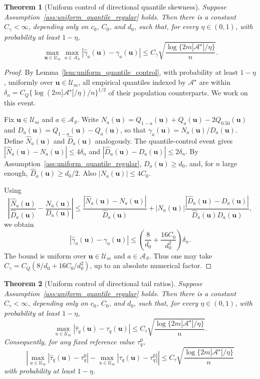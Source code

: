 \documentclass[11pt]{article}
\theoremstyle{plain}
\newtheorem{theorem}{Theorem}
\theoremstyle{definition}
\theoremstyle{remark}
\def\u{\bm{u}}
\newcommand{\abs}[1]{\left\lvert #1 \right\rvert}
\begin{document}
\begin{theorem}[Uniform control of directional quantile skewness]
	\label{thm:uniform_quantile_skewness_concentration}
	Suppose Assumption~\ref{ass:uniform_quantile_regular} holds. Then there is a constant \(C_\gamma<\infty\), depending only on \(c_0\), \(C_0\), and \(d_0\), such that, for every \(\eta\in(0,1)\), with probability at least \(1-\eta\),
	\[
	\max_{\u\in\mathcal U_m}\max_{a\in\mathcal A_S} \abs{\widehat\gamma_{a}(\u)-\gamma_{a}(\u)} \leqslant C_\gamma
	\sqrt{\frac{\log\{2m \abs{\mathcal A^\star}/\eta\}}{n}}.
	\]
\end{theorem}

\begin{proof}
	By Lemma~\ref{lem:uniform_quantile_control}, with probability at least \(1-\eta\), uniformly over \(\u\in\mathcal U_m\), all empirical quantiles indexed by \(\mathcal A^\star\) are within \(\delta_n=C_Q\{\log(2m|\mathcal A^\star|/\eta)/n\}^{1/2}\) of their population counterparts. We work on this event.

	Fix \(\u\in\mathcal U_m\) and \(a\in\mathcal A_S\). Write \(N_a(\u)=Q_{1-a}(\u)+Q_a(\u)-2Q_{0.50}(\u)\) and \(D_a(\u)=Q_{1-a}(\u)-Q_a(\u)\), so that \(\gamma_{a}(\u)=N_a(\u)/D_a(\u)\). Define \(\widehat N_a(\u)\) and \(\widehat D_a(\u)\) analogously. The quantile-control event gives \(|\widehat N_a(\u)-N_a(\u)|\leqslant 4\delta_n\) and \(|\widehat D_a(\u)-D_a(\u)|\leqslant 2\delta_n\). By Assumption~\ref{ass:uniform_quantile_regular}, \(D_a(\u)\geqslant d_0\), and, for \(n\) large enough, \(\widehat D_a(\u)\geqslant d_0/2\). Also \(|N_a(\u)|\leqslant 4C_0\).

	Using
	\[
	\left|
	\frac{\widehat N_a(\u)}{\widehat D_a(\u)}
	-
	\frac{N_a(\u)}{D_a(\u)}
	\right|
	\le
	\frac{|\widehat N_a(\u)-N_a(\u)|}{\widehat D_a(\u)}
	+
	|N_a(\u)|
	\frac{|\widehat D_a(\u)-D_a(\u)|}{\widehat D_a(\u)D_a(\u)},
	\]
	we obtain
	\[
    \abs{\widehat\gamma_{a}(\u)-\gamma_{a}(\u)} \leqslant \left(\frac{8}{d_0}+\frac{16C_0}{d_0^2}\right)\delta_n .
	\]
	The bound is uniform over \(\u\in\mathcal U_m\) and \(a\in\mathcal A_S\). Thus one may take \(C_\gamma=C_Q(8/d_0+16C_0/d_0^2)\), up to an absolute numerical factor.
\end{proof}

\begin{theorem}[Uniform control of directional tail ratios]
	\label{thm:uniform_tail_concentration}
	Suppose Assumption~\ref{ass:uniform_quantile_regular} holds. Then there is a constant \(C_\tau<\infty\), depending only on \(c_0\), \(C_0\), and \(d_0\), such that, for every \(\eta\in(0,1)\), with probability at least \(1-\eta\),
	\[
	\max_{u\in\mathcal U_m} \abs{\widehat\tau_q(\u)-\tau_q(\u)} \leqslant C_\tau \sqrt{\frac{\log\{2m|\mathcal A^\star|/\eta\}}{n}}.
	\]
	Consequently, for any fixed reference value \(\tau_q^0\),
	\[
	\abs{\max_{u\in\mathcal U_m} \abs{\widehat\tau_q(\u)-\tau_q^0} - \max_{u\in\mathcal U_m} \abs{\tau_q(\u)-\tau_q^0}} \leqslant C_\tau \sqrt{\frac{\log\{2m|\mathcal A^\star|/\eta\}}{n}}
	\]
	with probability at least \(1-\eta\).
\end{theorem}
\end{document}
